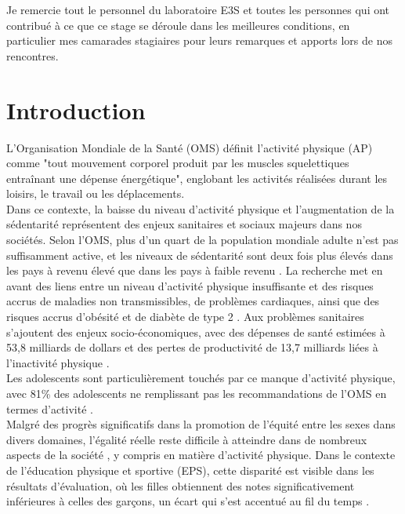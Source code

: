 \documentclass[12pt,a4paper]{article}
\renewcommand{\sectionmark}[1]{\markboth{#1}{}}
\begin{document}
	Je remercie tout le personnel du laboratoire E3S et toutes les personnes qui ont contribué à ce que ce stage se déroule dans les meilleures conditions, en particulier mes camarades stagiaires pour leurs remarques et apports lors de nos rencontres.

	\newpage
\section*{Introduction}
\sectionmark{Introduction}

L'Organisation Mondiale de la Santé (OMS) définit l'activité physique (AP) comme "tout mouvement corporel produit par les muscles squelettiques entraînant une dépense énergétique", englobant les activités réalisées durant les loisirs, le travail ou les déplacements.\\
Dans ce contexte, la baisse du niveau d'activité physique et l'augmentation de la sédentarité représentent des enjeux sanitaires et sociaux majeurs dans nos sociétés. Selon l'OMS, plus d'un quart de la population mondiale adulte n'est pas suffisamment active, et les niveaux de sédentarité sont deux fois plus élevés dans les pays à revenu élevé que dans les pays à faible revenu \cite{who2021}. La recherche met en avant des liens entre un niveau d’activité physique insuffisante et des risques accrus de maladies non transmissibles, de problèmes cardiaques, ainsi que des risques accrus d’obésité et de diabète de type 2 \cite{onaps2024campagne}. Aux problèmes sanitaires s’ajoutent des enjeux socio-économiques, avec des dépenses de santé estimées à 53,8 milliards de dollars et des pertes de productivité de 13,7 milliards liées à l’inactivité physique \cite{who2021}.\\
Les adolescents sont particulièrement touchés par ce manque d'activité physique, avec 81\% des adolescents ne remplissant pas les recommandations de l'OMS en termes d'activité \cite{who2021}.\\
Malgré des progrès significatifs dans la promotion de l'équité entre les sexes dans divers domaines, l'égalité réelle reste difficile à atteindre dans de nombreux aspects de la société \cite{UN_SDG_2020}, y compris en matière d'activité physique. Dans le contexte de l'éducation physique et sportive (EPS), cette disparité est visible dans les résultats d'évaluation, où les filles obtiennent des notes significativement inférieures à celles des garçons, un écart qui s'est accentué au fil du temps \cite{lentillon2005}.\\
\end{document}
